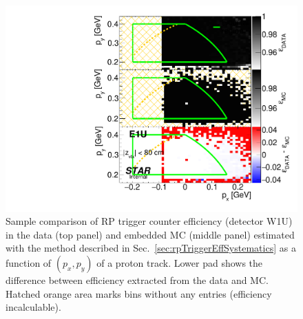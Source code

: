 \begin{figure}[h]%
	\centering
	\parbox{0.4725\textwidth}{
		\centering
		\includegraphics[width=\linewidth,page=5]{graphics/systematicsEfficiency/RpSyst/relativeTriggerEff2D_pxpy.pdf}%
	}
	\quad
	\parbox{0.4725\textwidth}{
		\centering\vspace*{-100pt}
		\caption[Coparison of estimated RP trigger counter efficiency in 2D (detector W1U).]%
    {Sample comparison of RP trigger counter efficiency (detector W1U) in the data (top panel) and embedded MC (middle panel) estimated with the method described in Sec.~\ref{sec:rpTriggerEffSystematics} as a function of $(p_{x},p_{y})$ of a proton track. Lower pad shows the difference between efficiency extracted from the data and MC. Hatched orange area marks bins without any entries (efficiency incalculable).%
    }
	}
	\label{fig:relativeRpRecoEff_W1U}
\end{figure}




